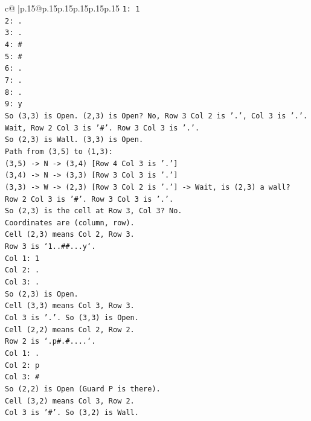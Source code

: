 \documentclass{article}
\begin{document}
{\begin{supertabular}{c@{$\;$}|p{.15\linewidth}@{}p{.15\linewidth}p{.15\linewidth}p{.15\linewidth}p{.15\linewidth}p{.15\linewidth}}
{{{\texttt{1: 1} \\
\texttt{2: .} \\
\texttt{3: .} \\
\texttt{4: \#} \\
\texttt{5: \#} \\
\texttt{6: .} \\
\texttt{7: .} \\
\texttt{8: .} \\
\texttt{9: y} \\
\texttt{So (3,3) is Open. (2,3) is Open? No, Row 3 Col 2 is '.', Col 3 is '.'.} \\
\texttt{Wait, Row 2 Col 3 is '\#'. Row 3 Col 3 is '.'.} \\
\texttt{So (2,3) is Wall. (3,3) is Open.} \\
\texttt{Path from (3,5) to (1,3):} \\
\texttt{(3,5) {-}> N {-}> (3,4) {[}Row 4 Col 3 is '.'{]}} \\
\texttt{(3,4) {-}> N {-}> (3,3) {[}Row 3 Col 3 is '.'{]}} \\
\texttt{(3,3) {-}> W {-}> (2,3) {[}Row 3 Col 2 is '.'{]} {-}> Wait, is (2,3) a wall?} \\
\texttt{Row 2 Col 3 is '\#'. Row 3 Col 3 is '.'.} \\
\texttt{So (2,3) is the cell at Row 3, Col 3? No.} \\
\texttt{Coordinates are (column, row).} \\
\texttt{Cell (2,3) means Col 2, Row 3.} \\
\texttt{Row 3 is `1..\#\#...y`.} \\
\texttt{Col 1: 1} \\
\texttt{Col 2: .} \\
\texttt{Col 3: .} \\
\texttt{So (2,3) is Open.} \\
\texttt{Cell (3,3) means Col 3, Row 3.} \\
\texttt{Col 3 is '.'. So (3,3) is Open.} \\
\texttt{Cell (2,2) means Col 2, Row 2.} \\
\texttt{Row 2 is `.p\#.\#....`.} \\
\texttt{Col 1: .} \\
\texttt{Col 2: p} \\
\texttt{Col 3: \#} \\
\texttt{So (2,2) is Open (Guard P is there).} \\
\texttt{Cell (3,2) means Col 3, Row 2.} \\
\texttt{Col 3 is '\#'. So (3,2) is Wall.} \\
}}}
\end{supertabular}}
\end{document}
